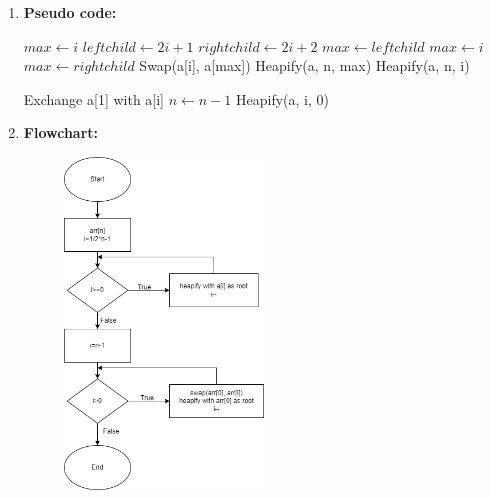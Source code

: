 \documentclass[11pt,a4paper]{article}
\begin{document}
{\begin{enumerate}[label=\textbf{\arabic*})]
					Heapsort is an in-place sorting method, i.e., no additional memory space is required except for loop and auxiliary variables. The number of these variables is always the same. Therefore the space complexity of heapsort is O(1).
				\\[12pt]
				\item \textbf{Pseudo code:} 
				\begin{algorithm}[H]
            	\begin{algorithmic}[1]
            			\State $max \gets i$
            			\State $leftchild \gets 2i+1$
            			\State $rightchild \gets 2i+2$
            				\State $max \gets leftchild$
            			\Else
            				\State $max \gets i$
            			\EndIf
            				\State $max \gets rightchild$
            			\EndIf
            				\State Swap(a[i], a[max])
            				\State Heapify(a, n, max)
            			\EndIf
            		\EndProcedure
            		\vspace{12pt}
            				Heapify(a, n, i)
            			\EndFor
            			
            				\State Exchange a[1] with a[i]
            				\State $n \gets n - 1$
            				\State Heapify(a, i, 0)
            			\EndFor
            		\EndProcedure
            	\end{algorithmic}
            \end{algorithm}
				\item \textbf{Flowchart:}
					\begin{figure}[H]
						\centering 
						\includegraphics[width=0.5\textwidth]{HeapSort Flowchart}
					\end{figure}
					

\end{enumerate}}
\end{document}
